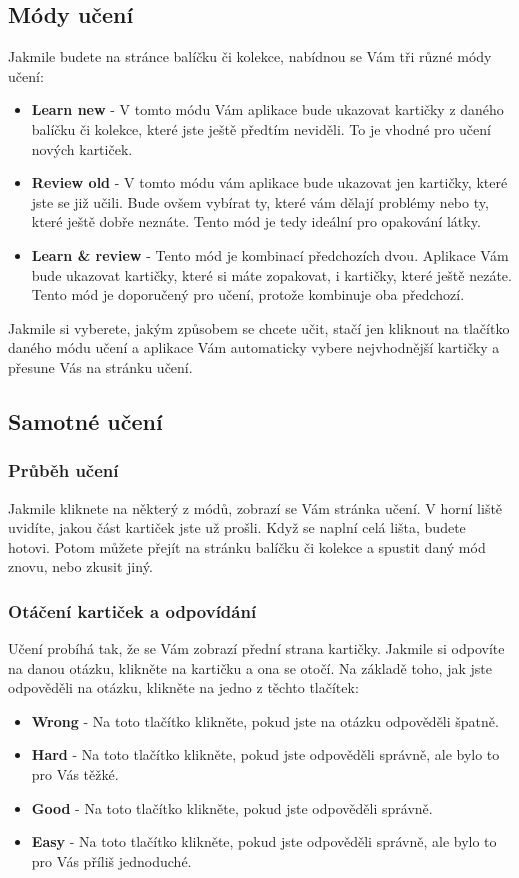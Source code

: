 \documentclass[a4paper,12pt]{article}
\begin{document}
\subsection{Módy učení}
Jakmile budete na stránce balíčku či kolekce, nabídnou se Vám tři různé módy učení:
\begin{itemize}
	\item \textbf{Learn new} - V tomto módu Vám aplikace bude ukazovat kartičky z daného balíčku či kolekce, které jste ještě předtím neviděli. To je vhodné pro učení nových kartiček.
	\item \textbf{Review old} - V tomto módu vám aplikace bude ukazovat jen kartičky, které jste se již učili. Bude ovšem vybírat ty, které vám dělají problémy nebo ty, které ještě dobře neznáte. Tento mód je tedy ideální pro opakování látky.
	\item \textbf{Learn \& review} - Tento mód je kombinací předchozích dvou. Aplikace Vám bude ukazovat kartičky, které si máte zopakovat, i kartičky, které ještě nezáte. Tento mód je doporučený pro učení, protože kombinuje oba předchozí.
\end{itemize}

Jakmile si vyberete, jakým způsobem se chcete učit, stačí jen kliknout na tlačítko daného módu učení a aplikace Vám automaticky vybere nejvhodnější kartičky a přesune Vás na stránku učení.

\subsection{Samotné učení}
\subsubsection*{Průběh učení}
Jakmile kliknete na některý z módů, zobrazí se Vám stránka učení. V horní liště uvidíte, jakou část kartiček jste už prošli. Když se naplní celá lišta, budete hotovi. Potom můžete přejít na stránku balíčku či kolekce a spustit daný mód znovu, nebo zkusit jiný.

\subsubsection*{Otáčení kartiček a odpovídání}
Učení probíhá tak, že se Vám zobrazí přední strana kartičky. Jakmile si odpovíte na danou otázku, klikněte na kartičku a ona se otočí. Na základě toho, jak jste odpověděli na otázku, klikněte na jedno z těchto tlačítek:
\begin{itemize}
	\item \textbf{Wrong  } - Na toto tlačítko klikněte, pokud jste na otázku odpověděli špatně.
	\item \textbf{Hard } - Na toto tlačítko klikněte, pokud jste odpověděli správně, ale bylo to pro Vás těžké.
	\item \textbf{Good } - Na toto tlačítko klikněte, pokud jste odpověděli správně. 
	\item \textbf{Easy } - Na toto tlačítko klikněte, pokud jste odpověděli správně, ale bylo to pro Vás příliš jednoduché.
\end{itemize}
\end{document}
